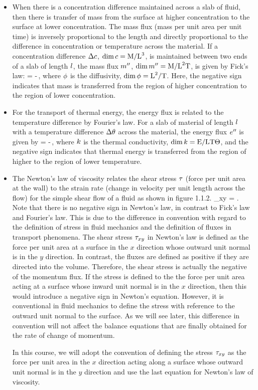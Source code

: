 \begin{itemize}
\item When there is a concentration difference maintained across a slab of fluid, then there is transfer of mass from the surface at higher concentration to the surface at lower concentration. The mass flux (mass per unit area per unit time) is inversely proportional to the length and directly proportional to the difference in concentration or temperature across the material. If a concentration difference $\Delta c$, $\dim c = \text{M}/\text{L}^3$, is maintained between two ends of a slab of length $l$, the mass flux ${m}^{\prime\prime}$, $\dim{m}^{\prime\prime} = \text{M}/\text{L}^2\text{T}$, is given by Fick's law:
\beq
\flux\mass = -\kdiff \dfrac{\Dx\conc}{\length}\,,
\eeq
where $\phi$ is the diffusivity, $\dim\phi = \text{L}^2/\text{T}$.
Here, the negative sign indicates that mass is transferred from the region of higher concentration to the region of lower concentration.
%
\item For the transport of thermal energy, the energy flux is related to the temperature difference by Fourier's law. For a slab of material of length $l$ with a temperature difference $\Delta\theta$ across the material, the energy flux ${e}^{\prime\prime}$ is given by
\beq
\flux\then = -\kthcond\dfrac{\Dx\temp}{\length}\,,
\eeq
where $k$ is the thermal conductivity, $\dim k = \text{E}/\text{L}\text{T}\Theta$, and the negative sign indicates that thermal energy is transferred from the region of higher to the region of lower temperature.
%
\item The Newton's law of viscosity relates the shear stress $\tau$ (force per unit area at the wall) to the strain rate (change in velocity per unit length across the flow) for the simple shear flow of a fluid as shown in figure 1.1.2.
\beq
\shear_{xy} = \kinvis{}.
\eeq
Note that there is no negative sign in Newton's law, in contrast to Fick's law and Fourier's law. This is due to the difference in convention with regard to the definition of stress in fluid mechanics and the definition of fluxes in transport phenomena. The shear stress $\tau_{xy}$ in Newton's law is defined as the force per unit area at a surface in the $x$ direction whose outward unit normal is in the $y$ direction. In contrast, the fluxes are defined as positive if they are directed into the volume. Therefore, the shear stress is actually the negative of the momentum flux. If the stress is defined to the the force per unit area acting at a surface whose inward unit normal is in the $x$ direction, then this would introduce a negative sign in Newton's equation. However, it is conventional in fluid mechanics to define the stress with reference to the outward unit normal to the surface. As we will see later, this difference in convention will not affect the balance equations that are finally obtained for the rate of change of momentum.

In this course, we will adopt the convention of defining the stress $\tau_{xy}$ as the force per unit area in the $x$ direction acting along a surface whose outward unit normal is in the $y$ direction and use the last equation for Newton's law of viscosity.
\end{itemize}

